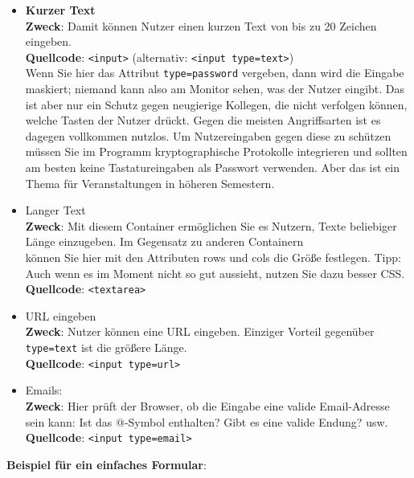 \begin{itemize}
	\item \textbf{Kurzer Text}\\	
	\textbf{Zweck}: Damit können Nutzer einen kurzen Text von bis zu 20 Zeichen eingeben.\\	
	\textbf{Quellcode}: \verb|<input>| (alternativ: \verb|<input type=text>|)\\	
	Wenn Sie hier das Attribut \verb|type=password| vergeben, dann wird die Eingabe maskiert; niemand kann also am Monitor sehen, was der Nutzer eingibt. Das ist aber nur ein Schutz gegen neugierige Kollegen, die nicht verfolgen können, welche Tasten der Nutzer drückt. Gegen die meisten Angriffsarten ist es dagegen vollkommen nutzlos. Um Nutzereingaben gegen diese zu schützen müssen Sie im Programm kryptographische Protokolle integrieren und sollten am besten keine Tastatureingaben als Passwort verwenden. Aber das ist ein Thema für Veranstaltungen in höheren Semestern.\\

	\item Langer Text\\
	\textbf{Zweck}: Mit diesem Container ermöglichen Sie es Nutzern, Texte beliebiger Länge einzugeben. Im Gegensatz zu anderen Containern \\können Sie hier mit den Attributen rows und cols die Größe festlegen. Tipp: Auch wenn es im Moment nicht so gut aussieht, nutzen Sie dazu besser CSS.\\
	\textbf{Quellcode}: \verb|<textarea>|\\

	\item URL eingeben\\
	\textbf{Zweck}: Nutzer können eine URL eingeben. Einziger Vorteil gegenüber \verb|type=text| ist die größere Länge.\\	
	\textbf{Quellcode}: \verb|<input type=url>|\\

	\item Emails:\\
	\textbf{Zweck}: Hier prüft der Browser, ob die Eingabe eine valide Email-Adresse sein kann: Ist das @-Symbol enthalten? Gibt es eine valide Endung? usw.\\	
	\textbf{Quellcode}: \verb|<input type=email>|\\
\end{itemize}

\textbf{Beispiel für ein einfaches Formular}:

